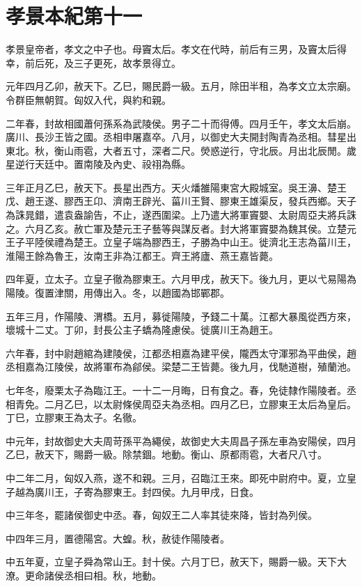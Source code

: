 \chapter{孝景本紀第十一}

孝景皇帝者，孝文之中子也。母竇太后。孝文在代時，前后有三男，及竇太后得幸，前后死，及三子更死，故孝景得立。

元年四月乙卯，赦天下。乙巳，賜民爵一級。五月，除田半租，為孝文立太宗廟。令群臣無朝賀。匈奴入代，與約和親。

二年春，封故相國蕭何孫系為武陵侯。男子二十而得傅。四月壬午，孝文太后崩。廣川、長沙王皆之國。丞相申屠嘉卒。八月，以御史大夫開封陶青為丞相。彗星出東北。秋，衡山雨雹，大者五寸，深者二尺。熒惑逆行，守北辰。月出北辰閒。歲星逆行天廷中。置南陵及內史、祋祤為縣。

三年正月乙巳，赦天下。長星出西方。天火燔雒陽東宮大殿城室。吳王濞、楚王戊、趙王遂、膠西王卬、濟南王辟光、菑川王賢、膠東王雄渠反，發兵西鄉。天子為誅晁錯，遣袁盎諭告，不止，遂西圍梁。上乃遣大將軍竇嬰、太尉周亞夫將兵誅之。六月乙亥。赦亡軍及楚元王子藝等與謀反者。封大將軍竇嬰為魏其侯。立楚元王子平陸侯禮為楚王。立皇子端為膠西王，子勝為中山王。徙濟北王志為菑川王，淮陽王餘為魯王，汝南王非為江都王。齊王將廬、燕王嘉皆薨。

四年夏，立太子。立皇子徹為膠東王。六月甲戌，赦天下。後九月，更以弋易陽為陽陵。復置津關，用傳出入。冬，以趙國為邯鄲郡。

五年三月，作陽陵、渭橋。五月，募徙陽陵，予錢二十萬。江都大暴風從西方來，壞城十二丈。丁卯，封長公主子蟜為隆慮侯。徙廣川王為趙王。

六年春，封中尉趙綰為建陵侯，江都丞相嘉為建平侯，隴西太守渾邪為平曲侯，趙丞相嘉為江陵侯，故將軍布為鄃侯。梁楚二王皆薨。後九月，伐馳道樹，殖蘭池。

七年冬，廢栗太子為臨江王。一十二一月晦，日有食之。春，免徒隸作陽陵者。丞相青免。二月乙巳，以太尉條侯周亞夫為丞相。四月乙巳，立膠東王太后為皇后。丁巳，立膠東王為太子。名徹。

中元年，封故御史大夫周苛孫平為繩侯，故御史大夫周昌子孫左車為安陽侯，四月乙巳，赦天下，賜爵一級。除禁錮。地動。衡山、原都雨雹，大者尺八寸。

中二年二月，匈奴入燕，遂不和親。三月，召臨江王來。即死中尉府中。夏，立皇子越為廣川王，子寄為膠東王。封四侯。九月甲戌，日食。

中三年冬，罷諸侯御史中丞。春，匈奴王二人率其徒來降，皆封為列侯。

中四年三月，置德陽宮。大蝗。秋，赦徒作陽陵者。

中五年夏，立皇子舜為常山王。封十侯。六月丁巳，赦天下，賜爵一級。天下大潦。更命諸侯丞相曰相。秋，地動。


